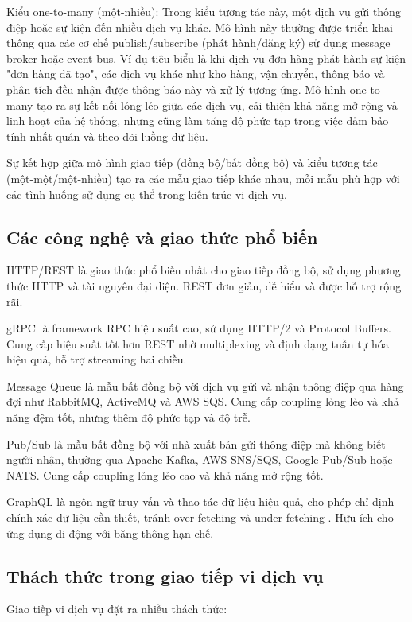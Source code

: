 Kiểu one-to-many (một-nhiều): Trong kiểu tương tác này, một dịch vụ gửi thông điệp hoặc sự kiện đến nhiều dịch vụ khác. Mô hình này thường được triển khai thông qua các cơ chế publish/subscribe (phát hành/đăng ký) sử dụng message broker hoặc event bus. Ví dụ tiêu biểu là khi dịch vụ đơn hàng phát hành sự kiện "đơn hàng đã tạo", các dịch vụ khác như kho hàng, vận chuyển, thông báo và phân tích đều nhận được thông báo này và xử lý tương ứng. Mô hình one-to-many tạo ra sự kết nối lỏng lẻo giữa các dịch vụ, cải thiện khả năng mở rộng và linh hoạt của hệ thống, nhưng cũng làm tăng độ phức tạp trong việc đảm bảo tính nhất quán và theo dõi luồng dữ liệu.

Sự kết hợp giữa mô hình giao tiếp (đồng bộ/bất đồng bộ) và kiểu tương tác (một-một/một-nhiều) tạo ra các mẫu giao tiếp khác nhau, mỗi mẫu phù hợp với các tình huống sử dụng cụ thể trong kiến trúc vi dịch vụ.

\subsection{Các công nghệ và giao thức phổ biến}
HTTP/REST là giao thức phổ biến nhất cho giao tiếp đồng bộ, sử dụng phương thức HTTP và tài nguyên đại diện. REST đơn giản, dễ hiểu và được hỗ trợ rộng rãi.

gRPC là framework RPC hiệu suất cao, sử dụng HTTP/2 và Protocol Buffers. Cung cấp hiệu suất tốt hơn REST nhờ multiplexing và định dạng tuần tự hóa hiệu quả, hỗ trợ streaming hai chiều.

Message Queue là mẫu bất đồng bộ với dịch vụ gửi và nhận thông điệp qua hàng đợi như RabbitMQ, ActiveMQ và AWS SQS. Cung cấp coupling lỏng lẻo và khả năng đệm tốt, nhưng thêm độ phức tạp và độ trễ.

Pub/Sub là mẫu bất đồng bộ với nhà xuất bản gửi thông điệp mà không biết người nhận, thường qua Apache Kafka, AWS SNS/SQS, Google Pub/Sub hoặc NATS. Cung cấp coupling lỏng lẻo cao và khả năng mở rộng tốt.

GraphQL là ngôn ngữ truy vấn và thao tác dữ liệu hiệu quả, cho phép chỉ định chính xác dữ liệu cần thiết, tránh over-fetching và under-fetching \cite{richardson2019}. Hữu ích cho ứng dụng di động với băng thông hạn chế.
 
\subsection{Thách thức trong giao tiếp vi dịch vụ}
Giao tiếp vi dịch vụ đặt ra nhiều thách thức:

